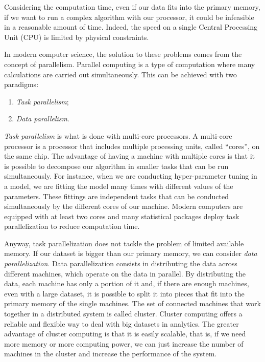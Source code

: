 \documentclass[a4paper, nobind]{templates/ociamthesis}
\providecommand{\tightlist}{%
  \setlength{\itemsep}{0pt}\setlength{\parskip}{0pt}}
\theoremstyle{definition}
\theoremstyle{definition}
\theoremstyle{definition}
\theoremstyle{remark}
\begin{document}
Considering the computation time, even if our data fits into the primary memory, if we want to run a complex algorithm with our processor, it could be infeasible in a reasonable amount of time. Indeed, the speed on a single Central Processing Unit (CPU) is limited by physical constraints.

In modern computer science, the solution to these problems comes from the concept of parallelism. Parallel computing is a type of computation where many calculations are carried out simultaneously. This can be achieved with two paradigms:

\begin{enumerate}
\def\labelenumi{\arabic{enumi}.}
\tightlist
\item
  \emph{Task parallelism};
\item
  \emph{Data parallelism}.
\end{enumerate}

\emph{Task parallelism} is what is done with multi-core processors. A multi-core processor is a processor that includes multiple processing units, called ``cores'', on the same chip. The advantage of having a machine with multiple cores is that it is possible to decompose our algorithm in smaller tasks that can be run simultaneously. For instance, when we are conducting hyper-parameter tuning in a model, we are fitting the model many times with different values of the parameters. These fittings are independent tasks that can be conducted simultaneously by the different cores of our machine. Modern computers are equipped with at least two cores and many statistical packages deploy task parallelization to reduce computation time.

Anyway, task parallelization does not tackle the problem of limited available memory. If our dataset is bigger than our primary memory, we can consider \emph{data parallelization}. Data parallelization consists in distributing the data across different machines, which operate on the data in parallel. By distributing the data, each machine has only a portion of it and, if there are enough machines, even with a large dataset, it is possible to split it into pieces that fit into the primary memory of the single machines. The set of connected machines that work together in a distributed system is called cluster. Cluster computing offers a reliable and flexible way to deal with big datasets in analytics. The greater advantage of cluster computing is that it is easily scalable, that is, if we need more memory or more computing power, we can just increase the number of machines in the cluster and increase the performance of the system.
\end{document}
